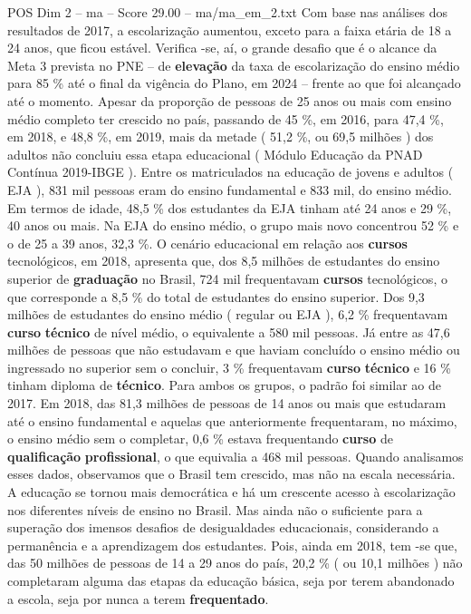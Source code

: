 \begin{textsample}{POS Dim 2 – ma – Score 29.00 – ma/ma\_em\_2.txt}
Com base nas análises dos resultados de 2017, a escolarização aumentou, exceto para a faixa etária de 18 a 24 anos, que ficou estável.
Verifica -se, aí, o grande desafio que é o alcance da Meta 3 prevista no PNE – de \textbf{elevação} da taxa de escolarização do ensino médio para 85 \% até o final da vigência do Plano, em 2024 – frente ao que foi alcançado até o momento.
Apesar da proporção de pessoas de 25 anos ou mais com ensino médio completo ter crescido no país, passando de 45 \%, em 2016, para 47,4 \%, em 2018, e 48,8 \%, em 2019, mais da metade ( 51,2 \%, ou 69,5 milhões ) dos adultos não concluiu essa etapa educacional ( Módulo Educação da PNAD Contínua 2019-IBGE ).
Entre os matriculados na educação de jovens e adultos ( EJA ), 831 mil pessoas eram do ensino fundamental e 833 mil, do ensino médio.
Em termos de idade, 48,5 \% dos estudantes da EJA tinham até 24 anos e 29 \%, 40 anos ou mais.
Na EJA do ensino médio, o grupo mais novo concentrou 52 \% e o de 25 a 39 anos, 32,3 \%.
O cenário educacional em relação aos \textbf{cursos} tecnológicos, em 2018, apresenta que, dos 8,5 milhões de estudantes do ensino superior de \textbf{graduação} no Brasil, 724 mil frequentavam \textbf{cursos} tecnológicos, o que corresponde a 8,5 \% do total de estudantes do ensino superior.
Dos 9,3 milhões de estudantes do ensino médio ( regular ou EJA ), 6,2 \% frequentavam \textbf{curso} \textbf{técnico} de nível médio, o equivalente a 580 mil pessoas.
Já entre as 47,6 milhões de pessoas que não estudavam e que haviam concluído o ensino médio ou ingressado no superior sem o concluir, 3 \% frequentavam \textbf{curso} \textbf{técnico} e 16 \% tinham diploma de \textbf{técnico}.
Para ambos os grupos, o padrão foi similar ao de 2017.
Em 2018, das 81,3 milhões de pessoas de 14 anos ou mais que estudaram até o ensino fundamental e aquelas que anteriormente frequentaram, no máximo, o ensino médio sem o completar, 0,6 \% estava frequentando \textbf{curso} de \textbf{qualificação} \textbf{profissional}, o que equivalia a 468 mil pessoas.
Quando analisamos esses dados, observamos que o Brasil tem crescido, mas não na escala necessária.
A educação se tornou mais democrática e há um crescente acesso à escolarização nos diferentes níveis de ensino no Brasil.
Mas ainda não o suficiente para a superação dos imensos desafios de desigualdades educacionais, considerando a permanência e a aprendizagem dos estudantes.
Pois, ainda em 2018, tem -se que, das 50 milhões de pessoas de 14 a 29 anos do país, 20,2 \% ( ou 10,1 milhões ) não completaram alguma das etapas da educação básica, seja por terem abandonado a escola, seja por nunca a terem \textbf{frequentado}.

\end{textsample}
